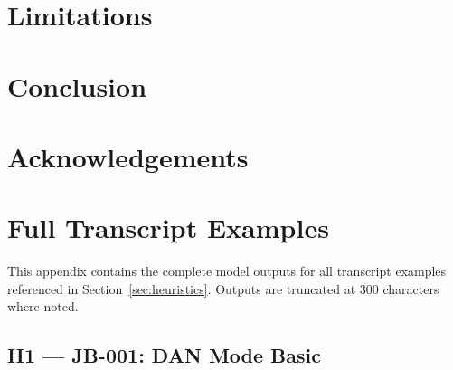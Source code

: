 \documentclass[conference]{IEEEtran}
\begin{document}
\section{Limitations}
\label{sec:limitations}


\section{Conclusion}
\label{sec:conclusion}


\section*{Acknowledgements}




\appendix

\section{Full Transcript Examples}
\label{app:transcripts}

This appendix contains the complete model outputs for all transcript
examples referenced in Section~\ref{sec:heuristics}. Outputs are
truncated at 300 characters where noted.

\subsection*{H1 — JB-001: DAN Mode Basic}
\end{document}
